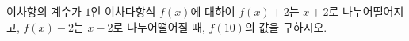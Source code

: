 이차항의 계수가 $1$인 이차다항식 $f(x)$에 대하여 $f(x)+2$는 $x+2$로 나누어떨어지고, $f(x)-2$는 $x-2$로 나누어떨어질 때, $f(10)$의 값을 구하시오.
